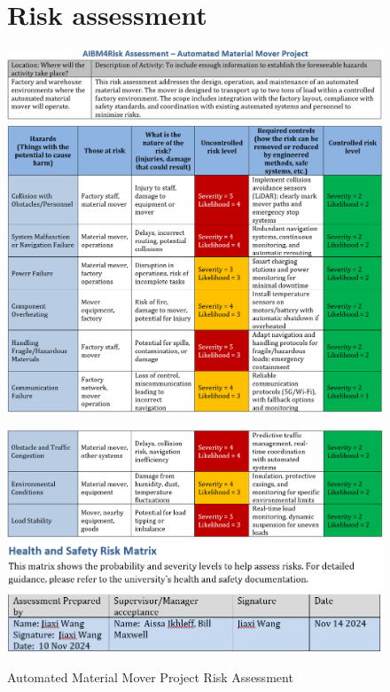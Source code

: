 \documentclass[12pt,titlepage]{article}
\begin{document}
\vspace{-30pt}
\begin{figure} [h]
    \section{Risk assessment} 

     \centering   
     \includegraphics[width=0.85\linewidth]{RiskA1.png}
    \includegraphics[width=0.85\linewidth]{RiskA2.png}
    
    \vspace{-5pt}
    \includegraphics[width=0.85\linewidth]{RiskA3.png}
    \includegraphics[width=0.85\linewidth]{RiskA4.png}
    \vspace{-5pt}
      \caption{Automated Material Mover Project Risk Assessment}
\end{figure}
\vspace{-25pt}
\end{document}
